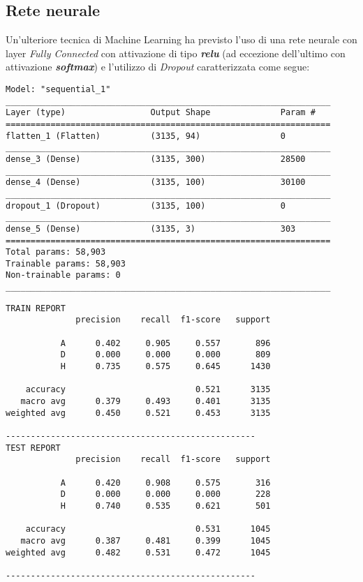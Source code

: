 \subsection{Rete neurale}
Un'ulteriore tecnica di Machine Learning ha previsto l'uso di una rete neurale con layer \textit{Fully Connected} con attivazione di tipo \textbf{\textit{relu}} (ad eccezione dell'ultimo con attivazione \textbf{\textit{softmax}}) e l'utilizzo di \textit{Dropout} caratterizzata come segue:
\begin{lstlisting}[style=arch]
Model: "sequential_1"
_________________________________________________________________
Layer (type)                 Output Shape              Param #   
=================================================================
flatten_1 (Flatten)          (3135, 94)                0         
_________________________________________________________________
dense_3 (Dense)              (3135, 300)               28500     
_________________________________________________________________
dense_4 (Dense)              (3135, 100)               30100     
_________________________________________________________________
dropout_1 (Dropout)          (3135, 100)               0         
_________________________________________________________________
dense_5 (Dense)              (3135, 3)                 303       
=================================================================
Total params: 58,903
Trainable params: 58,903
Non-trainable params: 0
_________________________________________________________________
\end{lstlisting}
\begin{lstlisting}[style=report]
TRAIN REPORT
              precision    recall  f1-score   support

           A      0.402     0.905     0.557       896
           D      0.000     0.000     0.000       809
           H      0.735     0.575     0.645      1430

    accuracy                          0.521      3135
   macro avg      0.379     0.493     0.401      3135
weighted avg      0.450     0.521     0.453      3135

--------------------------------------------------
TEST REPORT
              precision    recall  f1-score   support

           A      0.420     0.908     0.575       316
           D      0.000     0.000     0.000       228
           H      0.740     0.535     0.621       501

    accuracy                          0.531      1045
   macro avg      0.387     0.481     0.399      1045
weighted avg      0.482     0.531     0.472      1045

--------------------------------------------------
\end{lstlisting}

